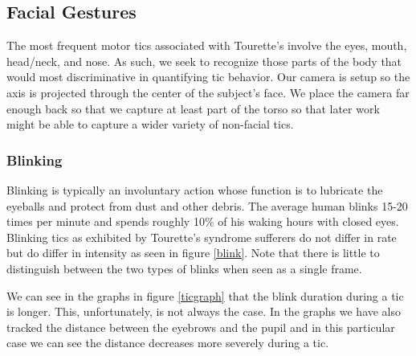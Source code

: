 \documentclass[11pt]{article}
\begin{document}
\subsection{Facial Gestures}
The most frequent motor tics associated with Tourette's involve the eyes, mouth, head/neck, and nose\cite{ganos2015}. As such, we seek to recognize those parts of the body that would most discriminative in quantifying tic behavior. Our camera is setup so the axis is projected through the center of the subject's face. We place the camera far enough back so that we capture at least part of the torso so that later work might be able to capture a wider variety of non-facial tics.
\subsubsection{Blinking}
Blinking is typically an involuntary action whose function is to lubricate the eyeballs and protect from dust and other debris. The average human blinks 15-20 times per minute and spends roughly 10\% of his waking hours with closed eyes. Blinking tics as exhibited by Tourette's syndrome sufferers do not differ in rate but do differ in intensity as seen in figure \ref{blink}. Note that there is little to distinguish between the two types of blinks when seen as a single frame.

We can see in the graphs in figure \ref{ticgraph} that the blink duration during a tic is longer. This, unfortunately, is not always the case. In the graphs we have also tracked the distance between the eyebrows and the pupil and in this particular case we can see the distance decreases more severely during a tic.
\end{document}
